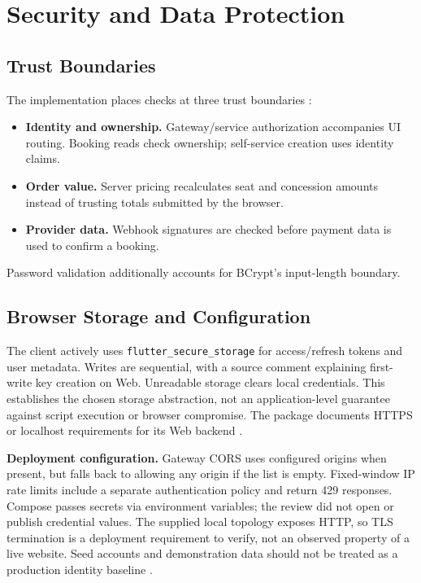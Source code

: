 \documentclass[conference]{IEEEtran}
\newenvironment{keypoints}{\begin{itemize}\setlength{\itemsep}{2pt}%
\setlength{\parsep}{0pt}}{\end{itemize}}
\newcommand{\code}[1]{\texttt{#1}}
\begin{document}
\section{Security and Data Protection}
\subsection{Trust Boundaries}
The implementation places checks at three trust boundaries
\cite{auth,gateway,booking}:
\begin{keypoints}
\item \textbf{Identity and ownership.} Gateway/service authorization accompanies
UI routing. Booking reads check ownership; self-service creation uses identity claims.
\item \textbf{Order value.} Server pricing recalculates seat and concession
amounts instead of trusting totals submitted by the browser.
\item \textbf{Provider data.} Webhook signatures are checked before payment data
is used to confirm a booking.
\end{keypoints}
Password validation additionally accounts for BCrypt's input-length boundary.

\subsection{Browser Storage and Configuration}
The client actively uses \code{flutter\_secure\_storage} for access/refresh
tokens and user metadata. Writes are sequential, with a source comment
explaining first-write key creation on Web. Unreadable storage clears local
credentials. This establishes the chosen storage abstraction, not an
application-level guarantee against script execution or browser compromise.
The package documents HTTPS or localhost requirements for its Web backend
\cite{client,storage}.

\textbf{Deployment configuration.} Gateway CORS uses configured origins when present, but falls back to allowing
any origin if the list is empty. Fixed-window IP rate limits include a separate
authentication policy and return 429 responses. Compose passes secrets via
environment variables; the review did not open or publish credential values.
The supplied local topology exposes HTTP, so TLS termination is a deployment
requirement to verify, not an observed property of a live website. Seed
accounts and demonstration data should not be treated as a production identity
baseline \cite{gateway,deployment,db}.
\end{document}
